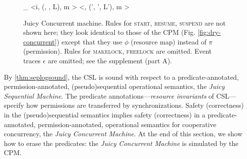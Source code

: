 \begin{figure}
\vspace{-1.1ex}
{\Psi \vdash_ 
\left<i\cdot\mho, (, \vec{\phi}, L), m \right>
\mapsto
\left<\mho, (', \vec{\phi}', L'), m \right>
\!\!\!
  }
% 
\vspace{-2ex}
\caption[Juicy Concurrent machine]{Juicy Concurrent machine.
  Rules for \textsc{start}, \textsc{resume}, \textsc{suspend} %
  are not shown here; they look identical to those of the CPM (Fig. \ref{fig:dry-concurrent})
  except that they use $\phi$ (resource map) instead of $\pi$ (permission).
  Rules for \textsc{makelock}, \textsc{freelock} are omitted.
  Event traces $\epsilon$ are omitted; see the supplement (part A).
}
\label{fig:juicy-concurrent}
\end{figure}



By \autoref{thm:seplogsound}, the
CSL is sound with respect to a predicate-annotated,
  per\-mis\-sion-annotated, (pseudo)se\-quen\-tial operational semantics, the \emph{Juicy Sequential Machine}.
  The predicate annotations---\emph{resource invariants} of CSL---specify
  how permissions are transferred by synchronizations.
  Safety (correctness) in the (pseudo)sequential semantics implies
  safety (correctness) in a predicate-annotated, per\-mis\-sion-annotated,
  operational semantics for cooperative concurrency,
  the \emph{Juicy Concurrent Machine}.
  At the end of this section, we show how to erase the predicates:
  the \emph{Juicy Concurrent Machine} is simulated by the CPM.

